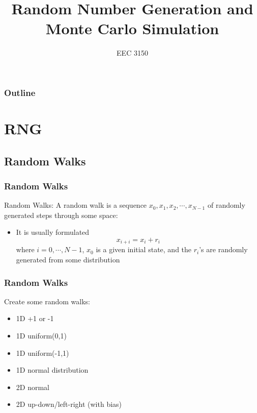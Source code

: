 \documentclass{beamer}
\title{Random Number Generation and Monte Carlo Simulation}
\author{EEC 3150}
\date{}
\institute{Trevecca Nazarene University}
\begin{document}
\frame{\titlepage}
 
\begin{frame}	
	\frametitle{Outline}
	\tableofcontents	
\end{frame}


\section{RNG}

\begin{frame}	
\end{frame}

\subsection{Random Walks}

\begin{frame}	
	\frametitle{Random Walks}
	
	\begin{block}{Random Walks:}
		A random walk is a sequence $x_0,x_1,x_2, \cdots, x_{N-1}$ of randomly generated steps through some space:
		\begin{itemize}
			\item It is usually formulated
			\begin{equation}
				x_{i+i} = x_i + r_i
			\end{equation}
			where $i=0, \cdots, N-1$, $x_0$ is a given initial state, and the $r_i$'s are randomly generated from some distribution
		\end{itemize}
	\end{block}
	
\end{frame}

\begin{frame}	
	\frametitle{Random Walks}
	
	\begin{exampleblock}{Create some random walks:}
		\begin{itemize}
			\item 1D +1 or -1
			\item 1D uniform(0,1)
			\item 1D uniform(-1,1)
			\item 1D normal distribution
			\item 2D normal
			\item 2D up-down/left-right (with bias)
		\end{itemize}
	\end{exampleblock}
	
\end{frame}
\end{document}
